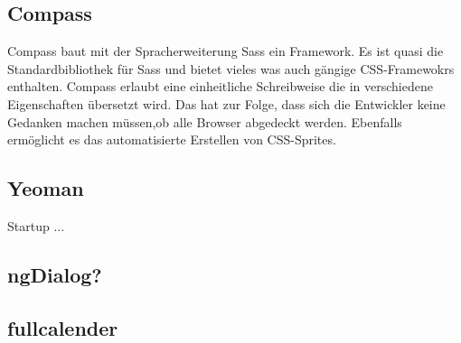 \subsection{Compass}
Compass baut mit der Spracherweiterung Sass ein Framework. Es ist quasi die Standardbibliothek für Sass und bietet vieles was auch gängige CSS-Framewokrs enthalten. Compass erlaubt eine einheitliche Schreibweise die in verschiedene Eigenschaften übersetzt wird. Das hat zur Folge, dass sich die Entwickler keine Gedanken machen müssen,ob alle Browser abgedeckt werden. Ebenfalls ermöglicht es das automatisierte Erstellen von CSS-Sprites. 
\subsection{Yeoman}
Startup ...

\subsection{ngDialog?}

\subsection{fullcalender}

